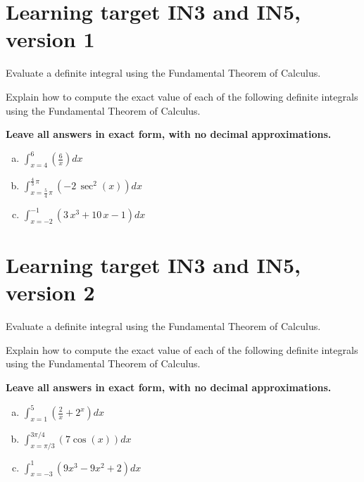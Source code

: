 
\usepackage{pgfplots}



\section{Learning target IN3 and IN5, version 1} %

Evaluate a definite integral using the Fundamental Theorem of Calculus.

\hrulefill


Explain how to compute the exact value of each of the following definite integrals using the Fundamental Theorem of Calculus. 

\textbf{Leave all answers in exact form, with no decimal approximations. }

\begin{enumerate}[(a)]
\item
 \(\displaystyle \int_{ x=4 }^{ 6 } \left( \frac{6}{x} \right) dx\) 

 \vfill

\item
 \(\int_{x= \frac{5}{4} \, \pi }^{ \frac{4}{3} \, \pi } \left( -2 \, \sec^2\left(x\right) \right) dx\)

\vfill

\item
 \(\int_{x= -2 }^{ -1 } \left( 3 \, x^{3} + 10 \, x - 1 \right) dx\)
\vfill
\end{enumerate}
\pagebreak

\section{Learning target IN3 and IN5, version 2} 

Evaluate a definite integral using the Fundamental Theorem of Calculus.

\hrulefill


Explain how to compute the exact value of each of the following definite integrals using the Fundamental Theorem of Calculus. 

\textbf{Leave all answers in exact form, with no decimal approximations. }

\begin{enumerate}[(a)]
\item
\(\displaystyle \int_{ x=1 }^{ 5 } \left( \frac{2}{x} + 2^x\right) dx\) 
\vfill
\item 
\(\displaystyle \int_{x=\pi/3}^{3\pi/4} \left( 7\cos(x) \right) dx\)
\vfill
\item
\(\displaystyle \int_{x= -3 }^{ 1 } \left( 9x^3 -9x^2 + 2\right) dx\)
\vfill

\end{enumerate}
\pagebreak

